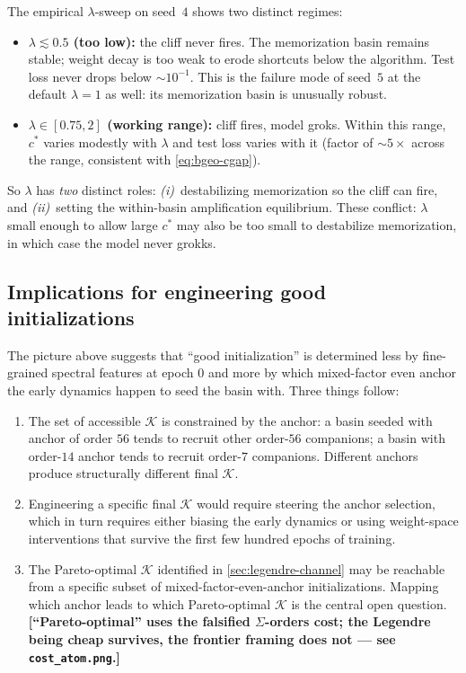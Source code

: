 The empirical $\lambda$-sweep on seed~$4$ shows two distinct regimes:

\begin{itemize}[leftmargin=*]
  \item \textbf{$\lambda \lesssim 0.5$ (too low):} the cliff never fires.
        The memorization basin remains stable; weight decay is too weak to
        erode shortcuts below the algorithm.  Test loss never drops below
        $\sim 10^{-1}$.  This is the failure mode of seed~$5$ at the
        default $\lambda = 1$ as well: its memorization basin is unusually
        robust.
  \item \textbf{$\lambda \in [0.75, 2]$ (working range):} cliff fires, model
        groks.  Within this range, $c^*$ varies modestly with $\lambda$
        and test loss varies with it (factor of $\sim 5\times$ across the
        range, consistent with \eqref{eq:bgeo-cgap}).
\end{itemize}

So $\lambda$ has \emph{two} distinct roles: \emph{(i)}~destabilizing
memorization so the cliff can fire, and \emph{(ii)}~setting the within-basin
amplification equilibrium.  These conflict: $\lambda$ small enough to
allow large $c^*$ may also be too small to destabilize memorization, in
which case the model never grokks.

\subsection{Implications for engineering good initializations}
\label{subsec:bgeo-engineering}

The picture above suggests that ``good initialization'' is determined less by
fine-grained spectral features at epoch $0$ and more by which mixed-factor
even anchor the early dynamics happen to seed the basin with.  Three things
follow:

\begin{enumerate}[leftmargin=*]
  \item The set of accessible $\mathcal K$ is constrained by the anchor: a
        basin seeded with anchor of order $56$ tends to recruit other
        order-$56$ companions; a basin with order-$14$ anchor tends to
        recruit order-$7$ companions.  Different anchors produce
        structurally different final $\mathcal K$.
  \item Engineering a specific final $\mathcal K$ would require steering
        the anchor selection, which in turn requires either biasing the
        early dynamics or using weight-space interventions that survive
        the first few hundred epochs of training.
  \item {\color{red}The Pareto-optimal $\mathcal K$ identified in
        \cref{sec:legendre-channel} may be reachable from a specific
        subset of mixed-factor-even-anchor initializations.  Mapping which
        anchor leads to which Pareto-optimal $\mathcal K$ is the central
        open question. \textbf{[``Pareto-optimal'' uses the falsified $\Sigma$-orders cost; the Legendre being cheap survives, the frontier framing does not --- see \texttt{cost\_atom.png}.]}}
\end{enumerate}

